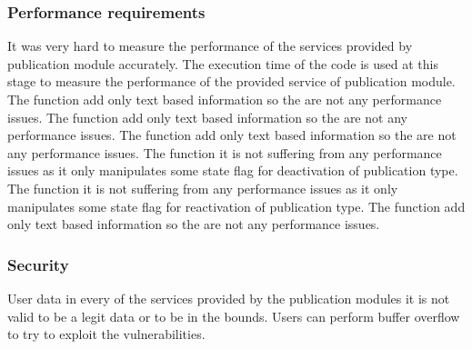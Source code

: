 \subsubsection{Performance requirements}
It was very hard to measure the performance of the services provided by publication module accurately. The execution time of the code is used at this stage to measure the performance of the provided service of publication module.
 The function add only text based information so the are not any performance issues.
 The function add only text based information so the are not any performance issues.
 The function add only text based information so the are not any performance issues.
 The function it is not suffering from any performance issues as it only manipulates some state flag for deactivation of publication type.
 The function it is not suffering from any performance issues as it only manipulates some state flag for reactivation of publication type.
 The function add only text based information so the are not any performance issues.

\subsubsection{Security}
User data in every of the services provided by the publication modules it is not valid to be a legit data or to be in the bounds. Users can perform buffer overflow to try to exploit the vulnerabilities.
